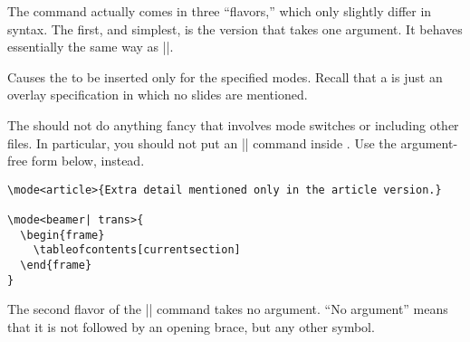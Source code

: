 The command actually comes in three ``flavors,'' which only slightly differ in syntax. The first, and simplest, is the version that takes one argument. It behaves essentially the same way as |\only|.

\begin{command}{\mode{}}
  Causes the  to be inserted only for the specified modes. Recall that a  is just an overlay specification in which no slides are mentioned.

  The  should not do anything fancy that involves mode switches or including other files. In particular, you should not put an || command inside . Use the argument-free form below, instead.

  \example
\begin{Verbatim}
\mode<article>{Extra detail mentioned only in the article version.}

\mode<beamer| trans>{
  \begin{frame}
    \tableofcontents[currentsection]
  \end{frame}
}
\end{Verbatim}
\end{command}

The second flavor of the |\mode| command takes no argument. ``No argument'' means that it is not followed by an opening brace, but any other symbol.

